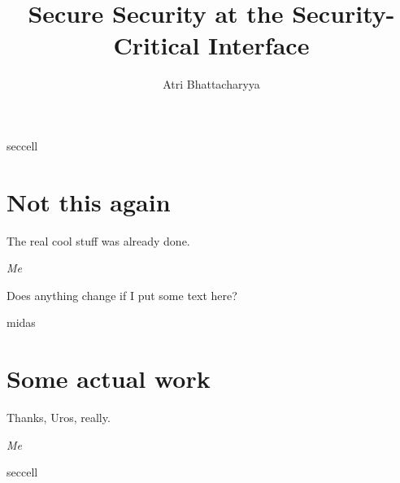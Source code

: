 \documentclass[lablogo]{thesis}
\title{Secure Security at the Security-Critical Interface}
\author{Atri Bhattacharyya}
\begin{document}



\begin{namedscope}{seccell}
\chapter{Not this again}
\label{ch:seccell}
\epigraph{The real cool stuff was already done.}%
        {\textit{Me}}

Does anything change if I put some text here?


\end{namedscope}

\begin{namedscope}{midas}
  \chapter{Some actual work}
  \label{ch:midas}
  \epigraph{Thanks, Uros, really.}%
          {\textit{Me}}


\end{namedscope}

\appendices

\begin{namedscope}{seccell}

\end{namedscope}


\backmatter


{}

\end{document}
